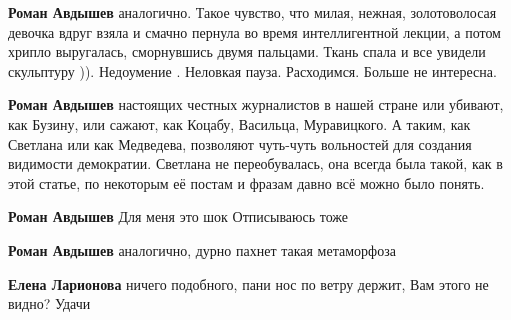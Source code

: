 \begin{itemize}
\begin{itemize}
 
\textbf{Роман Авдышев} аналогично. Такое чувство, что милая, нежная, золотоволосая девочка вдруг взяла и смачно пернула во время интеллигентной лекции, а потом хрипло выругалась, сморнувшись двумя пальцами. Ткань спала и все увидели скульптуру )). Недоумение . Неловкая пауза. Расходимся. Больше не интересна.

 
\textbf{Роман Авдышев} настоящих честных журналистов в нашей стране или убивают, как Бузину, или сажают, как Коцабу, Васильца, Муравицкого. А таким, как Светлана или как Медведева, позволяют чуть-чуть вольностей для создания видимости демократии. Светлана не переобувалась, она всегда была такой, как в этой статье, по некоторым её постам и фразам давно всё можно было понять.

 
\textbf{Роман Авдышев} Для меня это шок Отписываюсь тоже

 
\textbf{Роман Авдышев} аналогично, дурно пахнет такая метаморфоза

 
\textbf{Елена Ларионова} ничего подобного, пани нос по ветру держит, Вам этого не видно?
Удачи

 

\end{itemize}
\end{itemize}
